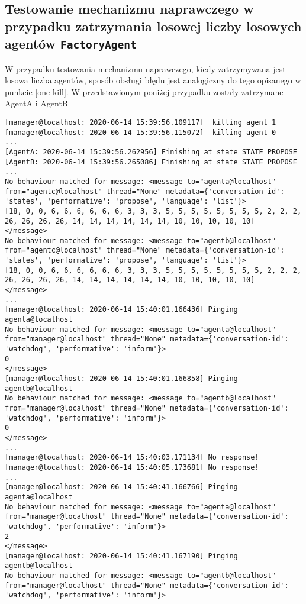\subsection{Testowanie mechanizmu naprawczego w przypadku zatrzymania losowej liczby losowych agentów \texttt{FactoryAgent}}
W przypadku testowania mechanizmu naprawczego, kiedy zatrzymywana jest losowa liczba agentów, sposób obsługi błędu jest analogiczny do tego opisanego w punkcie \ref{one-kill}. W przedstawionym poniżej przypadku zostały zatrzymane AgentA i AgentB
\begin{lstlisting}
[manager@localhost: 2020-06-14 15:39:56.109117]  killing agent 1
[manager@localhost: 2020-06-14 15:39:56.115072]  killing agent 0
...
[AgentA: 2020-06-14 15:39:56.262956] Finishing at state STATE_PROPOSE
[AgentB: 2020-06-14 15:39:56.265086] Finishing at state STATE_PROPOSE
...
No behaviour matched for message: <message to="agenta@localhost" from="agentc@localhost" thread="None" metadata={'conversation-id': 'states', 'performative': 'propose', 'language': 'list'}>
[18, 0, 0, 6, 6, 6, 6, 6, 6, 3, 3, 3, 5, 5, 5, 5, 5, 5, 5, 5, 2, 2, 2, 26, 26, 26, 26, 14, 14, 14, 14, 14, 14, 10, 10, 10, 10, 10]
</message>
No behaviour matched for message: <message to="agentb@localhost" from="agentc@localhost" thread="None" metadata={'conversation-id': 'states', 'performative': 'propose', 'language': 'list'}>
[18, 0, 0, 6, 6, 6, 6, 6, 6, 3, 3, 3, 5, 5, 5, 5, 5, 5, 5, 5, 2, 2, 2, 26, 26, 26, 26, 14, 14, 14, 14, 14, 14, 10, 10, 10, 10, 10]
</message>
...
[manager@localhost: 2020-06-14 15:40:01.166436] Pinging agenta@localhost
No behaviour matched for message: <message to="agenta@localhost" from="manager@localhost" thread="None" metadata={'conversation-id': 'watchdog', 'performative': 'inform'}>
0
</message>
[manager@localhost: 2020-06-14 15:40:01.166858] Pinging agentb@localhost
No behaviour matched for message: <message to="agentb@localhost" from="manager@localhost" thread="None" metadata={'conversation-id': 'watchdog', 'performative': 'inform'}>
0
</message>
...
[manager@localhost: 2020-06-14 15:40:03.171134] No response!
[manager@localhost: 2020-06-14 15:40:05.173681] No response!
...
[manager@localhost: 2020-06-14 15:40:41.166766] Pinging agenta@localhost
No behaviour matched for message: <message to="agenta@localhost" from="manager@localhost" thread="None" metadata={'conversation-id': 'watchdog', 'performative': 'inform'}>
2
</message>
[manager@localhost: 2020-06-14 15:40:41.167190] Pinging agentb@localhost
No behaviour matched for message: <message to="agentb@localhost" from="manager@localhost" thread="None" metadata={'conversation-id': 'watchdog', 'performative': 'inform'}>

\end{lstlisting}

